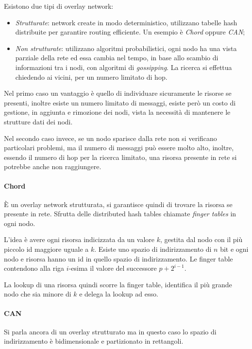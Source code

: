 Esistono due tipi di overlay network:
\begin{itemize}
    \item \emph{Strutturate}: network create in modo deterministico, utilizzano 
    tabelle hash distribuite per garantire routing efficiente. 
    Un esempio è \emph{Chord} oppure \emph{CAN};
    \item \emph{Non strutturate}: utilizzano algoritmi probabilistici, 
    ogni nodo ha una vista parziale della rete ed essa cambia nel tempo, 
    in base allo scambio di informazioni tra i nodi, con algoritmi di \emph{gossipping}.
    La ricerca si effettua chiedendo ai vicini, per un numero limitato di hop.
\end{itemize}
Nel primo caso un vantaggio è quello di individuare sicuramente le risorse se presenti,
inoltre esiste un numero limitato di messaggi, esiste però un costo di gestione, 
in aggiunta e rimozione dei nodi, vista la necessità di mantenere le strutture 
dati dei nodi.

Nel secondo caso invece, se un nodo sparisce dalla rete non si verificano 
particolari problemi, ma il numero di messaggi può essere molto alto, 
inoltre, essendo il numero di hop per la ricerca limitato, una risorsa 
presente in rete si potrebbe anche non raggiungere.

\paragraph{Chord}
È un overlay network strutturata, si garantisce quindi di trovare la risorsa
se presente in rete.
Sfrutta delle distributed hash tables chiamate \emph{finger tables} in ogni nodo. 

L'idea è avere ogni risorsa indicizzata da un valore $k$, gestita dal nodo 
con il più piccolo id maggiore uguale a $k$.
Esiste uno spazio di indirizzamento di $n$ bit e ogni nodo e risorsa hanno un id 
in quello spazio di indirizzamento.
Le finger table contendono alla riga $i$-esima il valore del successore $p + 2^{i-1}$.

La lookup di una risorsa quindi scorre la finger table, identifica il più grande 
nodo che sia minore di $k$ e delega la lookup ad esso.

\paragraph{CAN}
Si parla ancora di un overlay strutturato ma in questo caso lo spazio di indirizzamento 
è bidimensionale e partizionato in rettangoli. 

